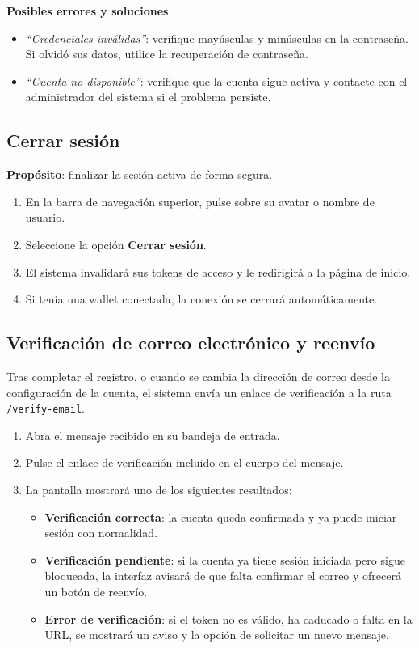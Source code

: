 \documentclass[11pt, a4paper]{article}
\begin{document}
\textbf{Posibles errores y soluciones}:
\begin{itemize}
    \item \textit{``Credenciales inv\'{a}lidas''}: verifique may\'{u}sculas y min\'{u}sculas en la contrase\~{n}a. Si olvid\'{o} sus datos, utilice la recuperaci\'{o}n de contrase\~{n}a.
    \item \textit{``Cuenta no disponible''}: verifique que la cuenta sigue activa y contacte con el administrador del sistema si el problema persiste.
\end{itemize}

\subsection{Cerrar sesi\'{o}n}

\textbf{Prop\'{o}sito}: finalizar la sesi\'{o}n activa de forma segura.

\begin{enumerate}
    \item En la barra de navegaci\'{o}n superior, pulse sobre su avatar o nombre de usuario.
    \item Seleccione la opci\'{o}n \textbf{Cerrar sesi\'{o}n}.
    \item El sistema invalidar\'{a} sus tokens de acceso y le redirigir\'{a} a la p\'{a}gina de inicio.
    \item Si ten\'{i}a una wallet conectada, la conexi\'{o}n se cerrar\'{a} autom\'{a}ticamente.
\end{enumerate}

\subsection{Verificaci\'{o}n de correo electr\'{o}nico y reenv\'{i}o}

Tras completar el registro, o cuando se cambia la direcci\'{o}n de correo desde la configuraci\'{o}n de la cuenta, el sistema env\'{i}a un enlace de verificaci\'{o}n a la ruta \texttt{/verify-email}.

\begin{enumerate}
    \item Abra el mensaje recibido en su bandeja de entrada.
    \item Pulse el enlace de verificaci\'{o}n incluido en el cuerpo del mensaje.
    \item La pantalla mostrar\'{a} uno de los siguientes resultados:
    \begin{itemize}
        \item \textbf{Verificaci\'{o}n correcta}: la cuenta queda confirmada y ya puede iniciar sesi\'{o}n con normalidad.
        \item \textbf{Verificaci\'{o}n pendiente}: si la cuenta ya tiene sesi\'{o}n iniciada pero sigue bloqueada, la interfaz avisar\'{a} de que falta confirmar el correo y ofrecer\'{a} un bot\'{o}n de reenv\'{i}o.
        \item \textbf{Error de verificaci\'{o}n}: si el token no es v\'{a}lido, ha caducado o falta en la URL, se mostrar\'{a} un aviso y la opci\'{o}n de solicitar un nuevo mensaje.
    \end{itemize}
\end{enumerate}
\end{document}
